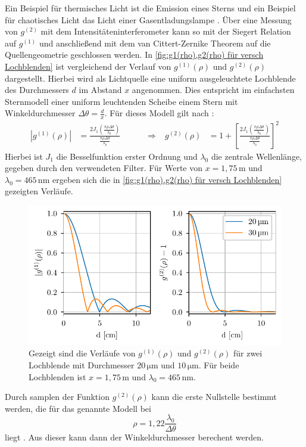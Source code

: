 Ein Beispiel für thermisches Licht ist die Emission eines Sterns und ein Beispiel für chaotisches Licht das Licht einer Gasentladungslampe \cite{foxQuantumOpticsIntroduction2006}. 
Über eine Messung von $g^{(2)}$ mit dem Intensitäteninterferometer kann so mit der Siegert Relation auf $g^{(1)}$ und anschließend mit dem van Cittert-Zernike Theorem auf die Quellengeometrie geschlossen werden. 
In \autoref{fig:g1(rho),g2(rho) für versch Lochblenden} ist vergleichend der Verlauf von $g^{(1)}(\rho)$ und $g^{(2)}(\rho)$ dargestellt. 
Hierbei wird als Lichtquelle eine uniform ausgeleuchtete Lochblende des Durchmessers $d$ im Abstand $x$ angenommen. 
Dies entspricht im einfachsten Sternmodell einer uniform leuchtenden Scheibe einem Stern mit Winkeldurchmesser $\Delta \theta = \frac{d}{x}$. 
Für dieses Modell gilt nach \cite[Kap. 4.1]{brownIntensityInterferometerIts1974}:
\begin{align}
    \left| g^{(1)}(\rho)\right| &= \frac{2J_1\left(\frac{\pi\rho\Delta\theta}{\lambda_0}\right)}{\frac{\pi\rho\Delta\theta}{\lambda_0}}\quad\quad\quad \Rightarrow & g^{(2)}(\rho) &= 1 + \left[\frac{2J_1\left(\frac{\pi\rho\Delta\theta}{\lambda_0}\right)}{\frac{\pi\rho\Delta\theta}{\lambda_0}}\right]^2
\end{align}
Hierbei ist $J_1$ die Besselfunktion erster Ordnung und $\lambda_0$ die zentrale Wellenlänge, gegeben durch den verwendeten Filter. 
Für Werte von $x=1,75\,\mathrm{m}$ und $\lambda_0=465\,\mathrm{nm}$ ergeben sich die in \autoref{fig:g1(rho),g2(rho) für versch Lochblenden} gezeigten Verläufe. 
\begin{figure}[htbp]
    \centering
    \includegraphics{images/Theorie/g1_g2_rho.pdf}
    \caption{Gezeigt sind die Verläufe von $g^{(1)}(\rho)$ und $g^{(2)}(\rho)$ für zwei Lochblende mit Durchmesser $20\,\mathrm{\mu m}$ und $10\,\mathrm{\mu m}$. Für beide Lochblenden ist $x=1,75\,\mathrm{m}$ und $\lambda_0=465\,\mathrm{nm}$.}
    \label{fig:g1(rho),g2(rho) für versch Lochblenden}
\end{figure}
Durch samplen der Funktion $g^{(2)}(\rho)$ kann die erste Nullstelle bestimmt werden, die für das genannte Modell bei 
\begin{equation}
    \rho=1,22\frac{\lambda_0}{\Delta\theta} 
    \label{eq:erste nulstelle von g2(rho) für lochblende}
\end{equation}
liegt \cite[Kap. 4.1]{brownIntensityInterferometerIts1974}. 
Aus dieser kann dann der Winkeldurchmesser berechent werden. \\


